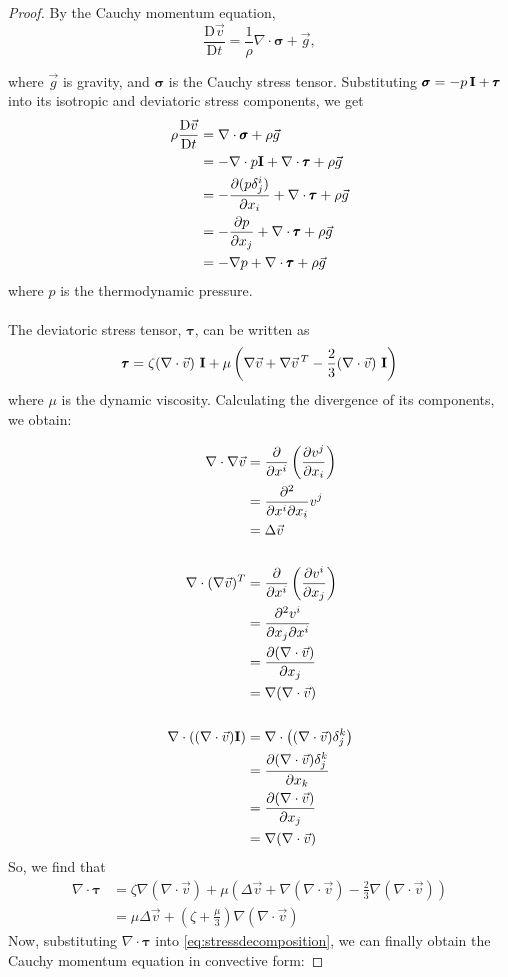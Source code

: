\documentclass[12 pt]{article}
\theoremstyle{definition}
\newcommand{\Dv}[2]{\frac{\text{D}{#1}}{\text {D}{#2}}}
\begin{document}
\begin{proof}
By the Cauchy momentum equation, 
\[\Dv{\vec{v}}{t} = \frac{1}{\rho}\nabla\cdot\pmb{\sigma} + \vec{g},\] 

where $\vec{g}$ is gravity, and $\pmb{\sigma}$ is the Cauchy stress tensor. Substituting $\pmb{\sigma} = - p\,\vb{I}+\pmb{\tau}$ into its isotropic and deviatoric stress components, we get 
\begin{align}
    \rho\Dv{\vec{v}}{t} &= \nabla\cdot \pmb{\sigma} + \rho \vec{g} \nonumber\\
    &= - \nabla\cdot p\vb{I}+\nabla\cdot\pmb{\tau}  + \rho \vec g\nonumber\\
    &= -\pdv{(p\delta_{j}^i)}{x_i}+\nabla \cdot \pmb{\tau}  + \rho\vec{g}\nonumber\\
    &= -\pdv{p}{x_j}+\nabla \cdot \pmb{\tau}  + \rho\vec{g}\nonumber \\
    &= - \nabla p+\nabla \cdot \pmb{\tau}  + \rho\vec{g} \label{eq:stressdecomposition}
\end{align}
where $p$ is the thermodynamic pressure.
\\\\
\noindent
The deviatoric stress tensor, $\pmb{\tau}$, can be written as \[\pmb{\tau} = \zeta(\nabla\cdot\vec{v})\,\,\vb{I}+\mu\left(\nabla\vec{v}+\nabla\vec{v}\,^T - \frac{2}{3}(\nabla\cdot\vec{v})\,\,\vb{I}\right)\]
where $\mu$ is the dynamic viscosity.
Calculating the divergence of its components, we obtain:

\begin{align*}
    \nabla\cdot\nabla\vec{v} &= \pdv{}{x^i}\left(\pdv{v^j}{x_i}\right)  \\
    &= \pdv{}{x^i}{x_i}v^j\\
    &= \Delta \vec{v}\\\\
    \nabla\cdot(\nabla\vec{v})^T &= \pdv{}{x^i}\left(\pdv{v^i}{x_j}\right)\\
    &= \pdv{v^i}{x_j}{x^i}\\
    &= \pdv{(\nabla\cdot\vec{v})}{x_j} \\
    &= \nabla(\nabla\cdot\vec{v})\\\\
    \nabla\cdot((\nabla\cdot\vec{v})\vb{I}) &= \nabla\cdot\left((\nabla\cdot\vec{v})\delta^k_{j}\right)\\
    &= \pdv{(\nabla\cdot\vec{v})\delta^k_j}{x_k}\\
    &= \pdv{(\nabla\cdot\vec{v})}{x_j}\\
    &= \nabla(\nabla \cdot \vec{v})
\end{align*}
\noindent
So, we find that 
\begin{align*}
\nabla\cdot\pmb{\tau} &= \zeta\nabla(\nabla \cdot \vec{v})+\mu\left(\Delta{\vec{v}} +\nabla(\nabla \cdot \vec{v}) - \frac{2}{3}\nabla(\nabla \cdot \vec{v})  \right) \\
&= \mu\Delta\vec{v} +\left(\zeta + \frac{\mu}{3}\right)\nabla(\nabla \cdot \vec{v})
\end{align*}
\noindent
Now, substituting $\nabla \cdot \pmb{\tau}$ into \eqref{eq:stressdecomposition}, we can finally obtain the Cauchy momentum equation in convective form:


\end{proof}
\end{document}
